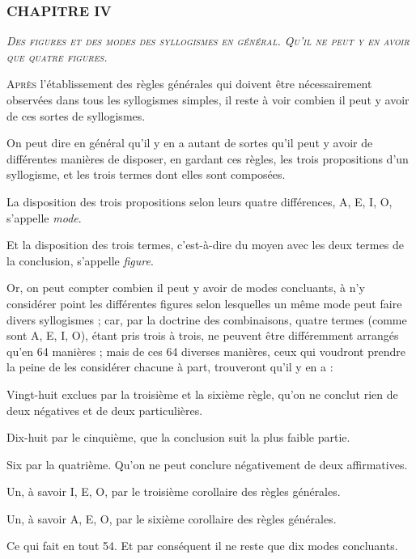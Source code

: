 \subsubsection{\centering \Large CHAPITRE IV}
\begin{center}\emph{\large\scshape Des figures et des modes des syllogismes en général. Qu'il ne peut y en avoir que quatre figures.}\end{center}

	\lettrine{A}{près} l'établissement des règles générales qui doivent être nécessairement observées dans tous les syllogismes simples, il reste à voir combien il peut y avoir de ces sortes de syllogismes.

On peut dire en général qu'il y en a autant de sortes qu'il peut y avoir de différentes manières de disposer, en gardant ces règles, les trois propositions d'un syllogisme, et les trois termes dont elles sont composées.

La disposition des trois propositions selon leurs quatre différences, A, E, I, O, s'appelle \emph{mode}.

Et la disposition des trois termes, c'est-à-dire du moyen avec les deux termes de la conclusion, s'appelle \emph{figure}.

Or, on peut compter combien il peut y avoir de modes concluants, à n'y considérer point les différentes figures selon lesquelles un même mode peut faire divers syllogismes ; car, par la doctrine des combinaisons, quatre termes (comme sont A, E, I, O), étant pris trois à trois, ne peuvent être différemment arrangés qu'en 64 manières ; mais de ces 64 diverses manières, ceux qui voudront prendre la peine de les considérer chacune à part, trouveront qu'il y en a :

Vingt-huit exclues par la troisième et la sixième règle, qu'on ne conclut rien de deux négatives et de deux particulières.

Dix-huit par le cinquième, que la conclusion suit la plus faible partie.

Six par la quatrième. Qu'on ne peut conclure négativement de deux affirmatives.

Un, à savoir I, E, O, par le troisième corollaire des règles générales.

Un, à savoir A, E, O, par le sixième corollaire des règles générales.

Ce qui fait en tout 54. Et par conséquent il ne reste que dix modes concluants.

